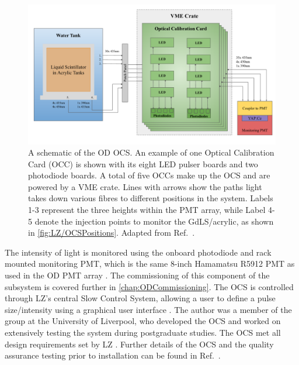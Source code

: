 \begin{figure}[!ht]
    \centering
    \includegraphics[width=\linewidth]{figures/LZ/OCSSchematics.pdf}
    \caption{A schematic of the OD OCS. An example of one Optical Calibration Card (OCC) is shown with its eight LED pulser boards and two photodiode boards. A total of five OCCs make up the OCS and are powered by a VME crate. Lines with arrows show the paths light takes down various fibres to different positions in the system. Labels 1-3 represent the three heights within the PMT array, while Label 4-5 denote the injection points to monitor the GdLS/acrylic, as shown in \autoref{fig:LZ/OCSPositions}. Adapted from Ref.~\cite{Turner:2021qvi,LZ:2024bsz}.}
    \label{fig:LZ/OCSSchematic}
\end{figure}
The intensity of light is monitored using the onboard photodiode and rack mounted monitoring PMT, which is the same 8-inch Hamamatsu R5912 PMT as used in the OD PMT array \cite{Turner:2021qvi}. The commissioning of this component of the subsystem is covered further in \autoref{chap:ODCommissioning}. The OCS is controlled through LZ's central Slow Control System, allowing a user to define a pulse size/intensity using a graphical user interface \cite{hbirch:thesis}.
The author was a member of the group at the University of Liverpool, who developed the OCS and worked on extensively testing the system during postgraduate studies. The OCS met all design requirements set by LZ \cite{Turner:2021qvi}. Further details of the OCS and the quality assurance testing prior to installation can be found in Ref.~\cite{hbirch:thesis,Turner:2021qvi}.
